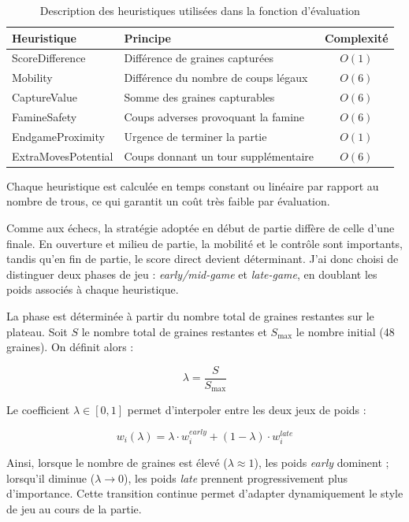\documentclass[11pt,a4paper]{article}
\begin{document}
\begin{table}[h]
\centering
\label{tab:heuristiques}
\begin{tabular}{|l|l|c|}
\hline
\textbf{Heuristique} & \textbf{Principe} & \textbf{Complexité} \\
\hline
ScoreDifference & Différence de graines capturées & $O(1)$ \\
Mobility & Différence du nombre de coups légaux & $O(6)$ \\
CaptureValue & Somme des graines capturables & $O(6)$ \\
FamineSafety & Coups adverses provoquant la famine & $O(6)$ \\
EndgameProximity & Urgence de terminer la partie & $O(1)$ \\
ExtraMovesPotential & Coups donnant un tour supplémentaire & $O(6)$ \\
\hline
\end{tabular}
\caption{Description des heuristiques utilisées dans la fonction d'évaluation}
\end{table}

Chaque heuristique est calculée en temps constant ou linéaire par rapport au nombre de trous, ce qui garantit un
coût très faible par évaluation. 

Comme aux échecs, la stratégie adoptée en début de partie diffère de celle d'une finale. En ouverture et milieu de partie, la
mobilité et le contrôle sont importants, tandis qu'en fin de partie, le score direct devient déterminant. J'ai donc choisi de
distinguer deux phases de jeu : \textit{early/mid-game} et \textit{late-game}, en doublant les poids associés à chaque heuristique.

La phase est déterminée à partir du nombre total de graines restantes sur le plateau. Soit $S$ le nombre total de graines restantes
et $S_{\max}$ le nombre initial (48 graines).
On définit alors :

\[
\lambda = \frac{S}{S_{\max}}
\]

Le coefficient $\lambda \in [0,1]$ permet d'interpoler entre les deux jeux de poids :

\[
w_i(\lambda) = \lambda \cdot w_i^{early} + (1-\lambda) \cdot w_i^{late}
\]

Ainsi, lorsque le nombre de graines est élevé ($\lambda \approx 1$), les poids \textit{early} dominent ; lorsqu'il diminue
($\lambda \to 0$), les poids \textit{late} prennent progressivement plus d'importance.
Cette transition continue permet d'adapter dynamiquement le style de jeu au cours de la partie.
\end{document}
